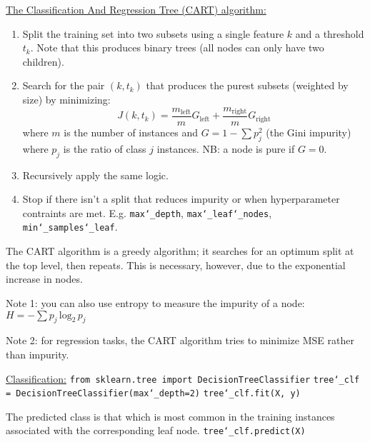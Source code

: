 \underline{The Classification And Regression Tree (CART) algorithm:}
\vspace{-3.0mm}
\begin{enumerate}
\item
Split the training set into two subsets using a single feature $k$ and a threshold $t_k$.\newline
Note that this produces binary trees (all nodes can only have two children).
\item
Search for the pair $(k, t_k)$ that produces the purest subsets (weighted by size)\newline
by minimizing:
\begin{equation}
J(k, t_k) = \frac{m_{\textrm{left}}}{m}G_{\textrm{left}} + \frac{m_{\textrm{right}}}{m}G_{\textrm{right}}
\end{equation}
where $m$ is the number of instances
and $G = 1 - \sum p_j^2$ (the Gini impurity)\newline
where $p_j$ is the ratio of class $j$ instances.
NB: a node is pure if $G=0$.
\item
Recursively apply the same logic.
\item
Stop if there isn't a split that reduces impurity
or when hyperparameter contraints are met.
E.g. \texttt{max\char`_depth}, \texttt{max\char`_leaf\char`_nodes}, \texttt{min\char`_samples\char`_leaf}.
\end{enumerate}

The CART algorithm is a greedy algorithm;
it searches for an optimum split at the top level, then repeats.
This is necessary, however, due to the exponential increase in nodes.

Note 1: you can also use entropy to measure the impurity of a node:
$H = - \sum p_j \, \textrm{log}_2 \, p_j$

Note 2: for regression tasks, the CART algorithm tries to minimize MSE rather than impurity.

\newpage
\underline{Classification:}\newline
\texttt{from sklearn.tree import DecisionTreeClassifier}\newline
\texttt{tree\char`_clf = DecisionTreeClassifier(max\char`_depth=2)}\newline
\texttt{tree\char`_clf.fit(X, y)}

The predicted class is that which is most common
in the training instances associated with the corresponding leaf node.\newline
\texttt{tree\char`_clf.predict(X)}

